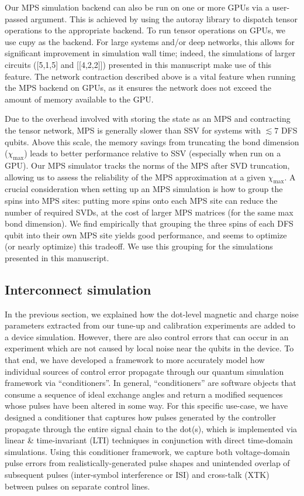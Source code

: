 \documentclass[aps,prl,twocolumn,superscriptaddress,nobibnotes,10pt,floatfix]{revtex4-2}
\begin{document}
Our MPS simulation backend can also be run on one or more GPUs via a user-passed argument.
This is achieved by using the autoray \cite{s_gray_autoray_2026} library to dispatch tensor operations to the appropriate backend.
To run tensor operations on GPUs, we use cupy \cite{s_okuta_cupy_2017} as the backend.
For large systems and/or deep networks, this allows for significant improvement in simulation wall time; indeed, the simulations of larger circuits ({[}5,1,5{]} and {[}{[}4,2,2{]}{]}) presented in this manuscript make use of this feature.
The network contraction described above is a vital feature when running the MPS backend on GPUs, as it ensures the network does not exceed the amount of memory available to the GPU.

Due to the overhead involved with storing the state as an MPS and contracting the tensor network, MPS is generally slower than SSV for systems with \(\lesssim 7\) DFS qubits.
Above this scale, the memory savings from truncating the bond dimension (\(\chi_{\max}\)) leads to better performance relative to SSV (especially when run on a GPU).
Our MPS simulator tracks the norms of the MPS after SVD truncation, allowing us to assess the reliability of the MPS approximation at a given \(\chi_{\max}\).
A crucial consideration when setting up an MPS simulation is how to group the spins into MPS sites: putting more spins onto each MPS site can reduce the number of required SVDs, at the cost of larger MPS matrices (for the same max bond dimension).
We find empirically that grouping the three spins of each DFS qubit into their own MPS site yields good performance, and seems to optimize (or nearly optimize) this tradeoff.
We use this grouping for the simulations presented in this manuscript.



\subsection{Interconnect simulation}\label{interconnect-simulation}

In the previous section, we explained how the dot-level magnetic and charge noise parameters extracted from our tune-up and calibration experiments are added to a device simulation.
However, there are also control errors that can occur in an experiment which are not caused by local noise near the qubits in the device.
To that end, we have developed a framework to more accurately model how individual sources of control error propagate through our quantum simulation framework via ``conditioners''.
In general, ``conditioners'' are software objects that consume a sequence of ideal exchange angles and return a modified sequences whose pulses have been altered in some way.
For this specific use-case, we have designed a conditioner that captures how pulses generated by the controller propagate through the entire signal chain to the dot(s), which is implemented via linear \& time-invariant (LTI) techniques in conjunction with direct time-domain simulations.
Using this conditioner framework, we capture both voltage-domain pulse errors from realistically-generated pulse shapes and unintended overlap of subsequent pulses (inter-symbol interference or ISI) and cross-talk (XTK) between pulses on separate control lines.
\end{document}
